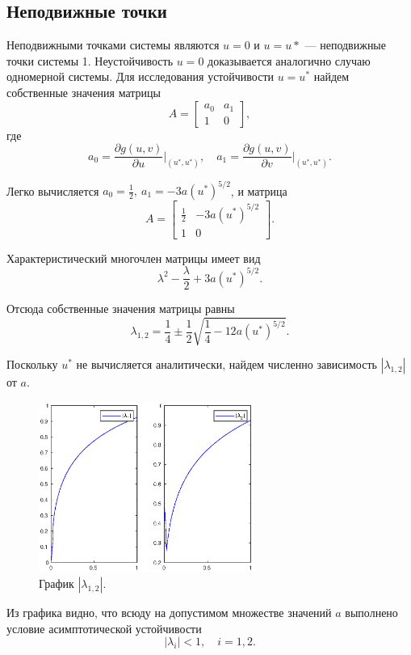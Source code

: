 \documentclass[16pt]{article}
\begin{document}
\subsection{Неподвижные точки}
Неподвижными точками системы являются $u = 0$ и $u = u*$ --- неподвижные точки системы 1. Неустойчивость $u = 0$ 
доказывается аналогично случаю одномерной системы. Для исследования устойчивости $u = u^*$ найдем собственные
значения матрицы 
$$A = \begin{bmatrix} a_0 & a_1 \\ 1 & 0 \end{bmatrix},$$
где
$$a_0 = \dfrac{\partial g(u,v)}{\partial u}\bigg|_{(u^*,u^*)}, \quad a_1 = \dfrac{\partial g(u,v)}{\partial v}\bigg|_{(u^*,u^*)}.$$

Легко вычисляется $a_0 = \frac12, \ a_1 = -3a(u^*)^{5/2}$, и матрица
$$A = \begin{bmatrix} \frac12 & -3a(u^*)^{5/2} \\ 1 & 0 \end{bmatrix}.$$

Характеристический многочлен матрицы имеет вид
$$\lambda^2 -\frac{\lambda}{2} + 3a(u^*)^{5/2}.$$

Отсюда собственные значения матрицы равны
$$\lambda_{1,2} = \frac{1}{4} \pm \frac{1}{2}\sqrt{\frac{1}{4} - 12a(u^*)^{5/2}}.$$

Поскольку $u^*$ не вычисляется аналитически, найдем численно зависимость $|\lambda_{1,2}|$ от $a$.

\begin{figure}[h]
\begin{center}
\includegraphics[width=70mm]{lambd.eps}
\caption{График $|\lambda_{1,2}|$.}
\end{center}
\end{figure}

Из графика видно, что всюду на допустимом множестве значений $a$ выполнено условие асимптотической устойчивости
$$|\lambda_i| < 1, \quad i = 1, 2.$$
\end{document}
